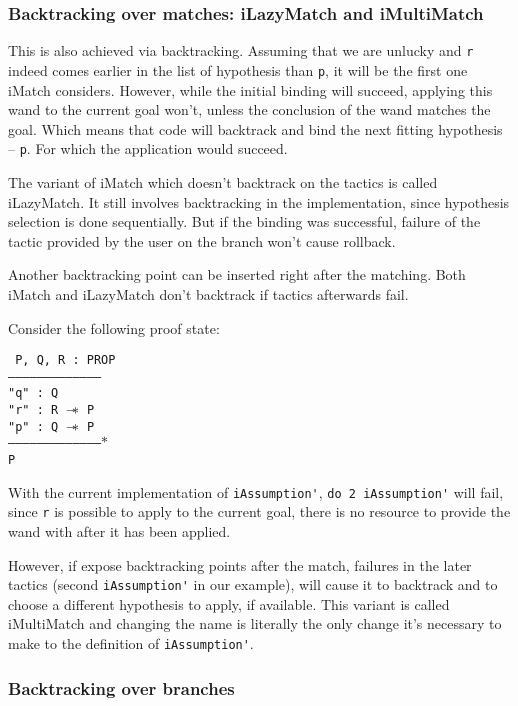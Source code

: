 \subsubsection{Backtracking over matches: iLazyMatch and iMultiMatch}

This is also achieved via backtracking.
Assuming that we are unlucky and \verb|r| indeed comes earlier in the list of hypothesis than \verb|p|, it will be the first one iMatch considers.
However, while the initial binding will succeed, applying this wand to the current goal won't, unless the conclusion of the wand matches the goal.
Which means that code will backtrack and bind the next fitting hypothesis -- \verb|p|.
For which the application would succeed.

The variant of iMatch which doesn't backtrack on the tactics is called iLazyMatch.
It still involves backtracking in the implementation, since hypothesis selection is done sequentially.
But if the binding was successful, failure of the tactic provided by the user on the branch won't cause rollback.

Another backtracking point can be inserted right after the matching.
Both iMatch and iLazyMatch don't backtrack if tactics afterwards fail.

Consider the following proof state:

\texttt{
P, Q, R : PROP\\
---------------------------------------\\
"q" : Q\\
"r" : R $\mathrel{-\mkern-6mu*}$ P\\
"p" : Q $\mathrel{-\mkern-6mu*}$ P\\
--------------------------------------$\ast$\\
P
}

With the current implementation of \verb|iAssumption'|, \verb|do 2 iAssumption'| will fail, since \verb|r| is possible to apply to the current goal, there is no resource to provide the wand with after it has been applied.

However, if expose backtracking points after the match, failures in the later tactics (second \verb|iAssumption'| in our example), will cause it to backtrack and
to choose a different hypothesis to apply, if available.
This variant is called iMultiMatch and changing the name is literally the only change it's necessary to make to the definition of \verb|iAssumption'|.

\subsubsection{Backtracking over branches}

